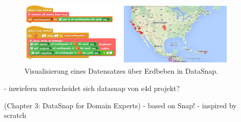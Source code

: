 \begin{figure}[!ht]
  \centering
    \includegraphics[width=0.95\textwidth]{assets/datasnap-visualization.png}
  \caption{Visualisierung eines Datensatzes über Erdbeben in DataSnap. \parencite{hellmannDataSnapEnabling2015}}
  \label{fig:datasnap-visualization}
\end{figure}

- inwiefern unterscheidet sich datasnap von s4d projekt?


\parencite{hellmannDataSnapEnabling2015} (Chapter 3: DataSnap for Domain Experts)
- based on Snap! 
  - inspired by scratch 

